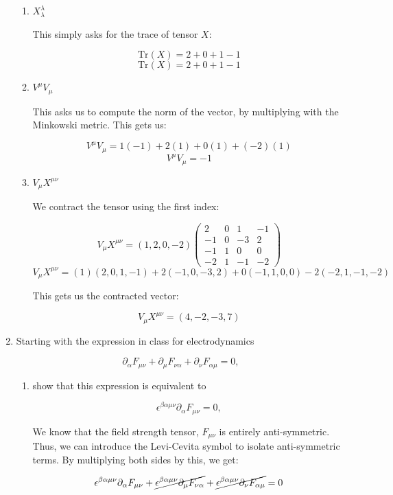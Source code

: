 \begin{enumerate}
\begin{enumerate}
      \item $X^{\lambda}_{\lambda}$

        This simply asks for the trace of tensor $X$:

        $$\text{Tr}(X)=2+0+1-1$$
        $$\boxed{\text{Tr}(X)=2+0+1-1}$$

      \item $V^{\mu}V_{\mu}$

        This asks us to compute the norm of the vector, by multiplying with the Minkowski metric. This gets us:

        $$V^{\mu}V_{\mu}=1(-1)+2(1)+0(1)+(-2)(1)$$
        $$\boxed{V^{\mu}V_{\mu}=-1}$$

      \item $V_{\mu}X^{\mu\nu}$

        We contract the tensor using the first index:

        $$V_{\mu}X^{\mu\nu}=\left( 1,2,0,-2 \right)\left( \begin{matrix} 2 & 0 & 1 & -1 \\ -1 & 0 & -3 & 2\\ -1 & 1 & 0 & 0\\ -2 & 1 & -1 & -2\end{matrix} \right)$$
        $$V_{\mu}X^{\mu\nu}=(1)\left( 2,0,1,-1\right)+2(-1, 0, -3, 2)+0(-1, 1, 0, 0)-2(-2, 1, -1, -2)$$

        This gets us the contracted vector:

        $$\boxed{V_{\mu}X^{\mu\nu}=(4,-2,-3,7)}$$

    \end{enumerate}

  \item Starting with the expression in class for electrodynamics

    $$\partial_{\alpha}F_{\mu\nu}+\partial_{\mu}F_{\nu\alpha}+\partial_{\nu}F_{\alpha\mu}=0,$$

    \begin{enumerate}

      \item show that this expression is equivalent to 

      $$\epsilon^{\beta\alpha\mu\nu}\partial_{\alpha}F_{\mu\nu}=0,$$ 

      We know that the field strength tensor, $F_{\mu\nu}$ is entirely anti-symmetric. Thus, we can introduce the Levi-Cevita symbol to isolate anti-symmetric terms. By multiplying both sides by this, we get:

      $$\epsilon^{\beta\alpha\mu\nu}\partial_{\alpha}F_{\mu\nu}+\cancel{\epsilon^{\beta\alpha\mu\nu}\partial_{\mu}F_{\nu\alpha}}+\cancel{\epsilon^{\beta\alpha\mu\nu}\partial_{\nu}F_{\alpha\mu}}=0$$


\end{enumerate}
\end{enumerate}
